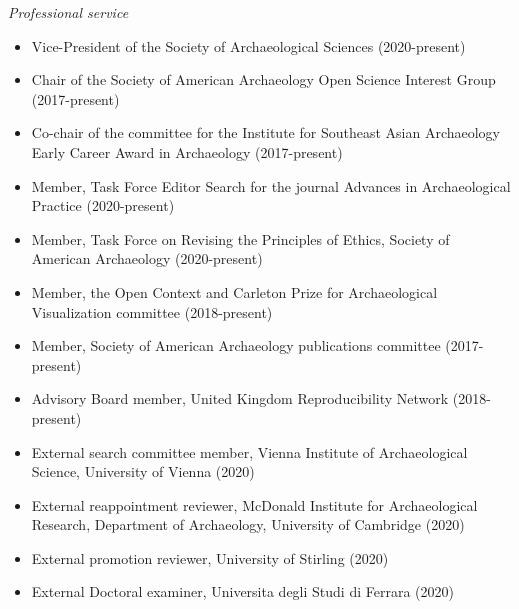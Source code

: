 \medskip

\noindent\emph{Professional service\vspace{0.01in}}

\medskip

\begin{itemize}[noitemsep, font=$\bullet$\scshape\bfseries]

\item Vice-President of the Society of Archaeological Sciences (2020-present)

\item Chair of the Society of American Archaeology Open Science Interest Group (2017-present)

\item Co-chair of the committee for the Institute for Southeast Asian Archaeology Early Career Award in Archaeology (2017-present)

\item Member, Task Force Editor Search for the journal Advances in Archaeological Practice (2020-present)

\item Member, Task Force on Revising the Principles of Ethics, Society of American Archaeology (2020-present)

\item Member, the Open Context and Carleton Prize for Archaeological Visualization committee (2018-present)

\item Member, Society of American Archaeology publications committee (2017-present)

\item Advisory Board member, United Kingdom Reproducibility Network (2018-present)

\item External search committee member, Vienna Institute of Archaeological Science, University of Vienna (2020)

\item External reappointment reviewer, McDonald Institute for Archaeological Research, Department of Archaeology, University of Cambridge (2020)

\item External promotion reviewer, University of Stirling (2020)

\item External Doctoral examiner, Universita degli Studi di Ferrara (2020)

\end{itemize}


